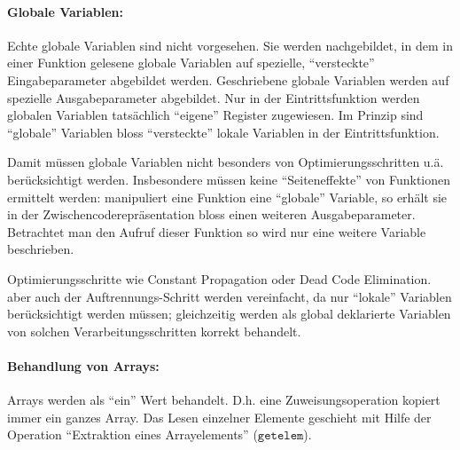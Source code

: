 \documentclass[twoside,a4paper,fleqn,12pt]{book}
\begin{document}
\paragraph{Globale Variablen:}
Echte globale Variablen sind nicht vorgesehen. Sie werden nachgebildet, in dem in einer Funktion gelesene globale Variablen
auf spezielle, "`versteckte"' Eingabeparameter abgebildet werden. Geschriebene globale Variablen werden
auf spezielle Ausgabeparameter abgebildet. Nur in der Eintrittsfunktion werden globalen Variablen tatsächlich
"`eigene"' Register zugewiesen. Im Prinzip sind "`globale"' Variablen bloss "`versteckte"' lokale Variablen in
der Eintrittsfunktion.

Damit müssen globale Variablen nicht besonders von Optimierungsschritten u.ä. berücksichtigt werden.
Insbesondere müssen keine "`Seiteneffekte"' von Funktionen ermittelt werden: manipuliert eine Funktion eine "`globale"' Variable,
so erhält sie in der Zwischencoderepräsentation bloss einen weiteren Ausgabeparameter.
Betrachtet man den Aufruf dieser Funktion so wird nur eine weitere Variable beschrieben.

Optimierungsschritte wie Constant Propagation oder Dead Code Elimination. aber auch der Auftrennungs-Schritt werden vereinfacht,
da nur "`lokale"' Variablen berücksichtigt werden müssen; gleichzeitig werden als global deklarierte Variablen
von solchen Verarbeitungsschritten korrekt behandelt.



\paragraph{Behandlung von Arrays:}
Arrays werden als "`ein"' Wert behandelt. D.h. eine Zuweisungsoperation kopiert immer ein ganzes Array.
Das Lesen einzelner Elemente geschieht mit Hilfe der Operation "`Extraktion eines Arrayelements"' ($\mathtt{getelem}$).
\end{document}
